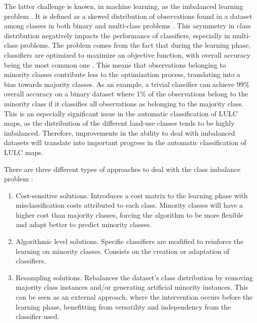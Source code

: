 \documentclass[parskip=full]{scrartcl}
\begin{document}
The latter challenge is known, in machine learning, as the imbalanced learning
problem \cite{Chawla2004}. It is defined as a skewed distribution of
observations found in a dataset among classes in both binary and multi-class
problems \cite{Abdi2016}. This asymmetry in class distribution negatively
impacts the performance of classifiers, especially in multi-class problems.
The problem comes from the fact that during the learning phase, classifiers
are optimized to maximize an objective function, with overall accuracy being
the most common one \cite{Maxwell2018}. This means that observations
belonging to minority classes contribute less to the optimization process,
translating into a bias towards majority classes.  As an example, a trivial
classifier can achieve 99\% overall accuracy on a binary dataset where 1\% of
the observations belong to the minority class if it classifies all
observations as belonging to the majority class. This is an especially
significant issue in the automatic classification of LULC maps, as the
distribution of the different land-use classes tends to be highly imbalanced.
Therefore, improvements in the ability to deal with imbalanced datasets will
translate into important progress in the automatic classification of LULC
maps.

There are three different types of approaches to deal with the class imbalance
problem \cite{Fernandez2013,Kaur2019}:

\begin{enumerate}
    \item Cost-sensitive solutions. Introduces a cost matrix to the learning
        phase with misclassification costs attributed to each class. Minority
        classes will have a higher cost than majority classes, forcing the
        algorithm to be more flexible and adapt better to predict minority
        classes.
    \item Algorithmic level solutions. Specific classifiers are modified to
        reinforce the learning on minority classes. Consists on the creation or
        adaptation of classifiers.
    \item Resampling solutions. Rebalances the dataset's class distribution by
        removing majority class instances and/or generating artificial minority
        instances. This can be seen as an external approach, where the
        intervention occurs before the learning phase, benefitting from
        versatility and independency from the classifier used.
\end{enumerate}
\end{document}
